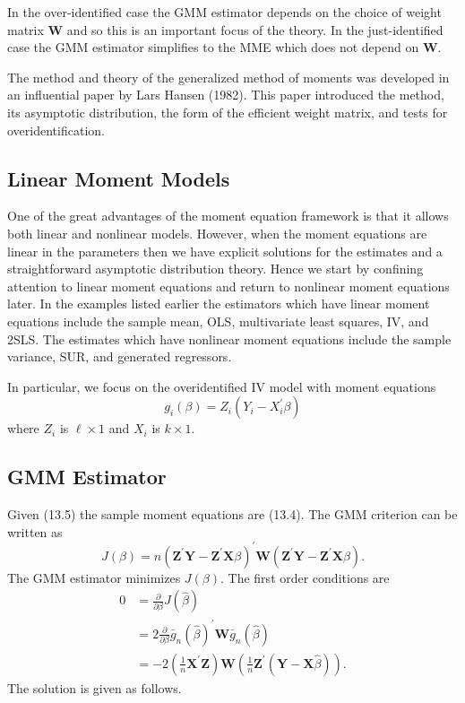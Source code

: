 \documentclass[10pt]{article}
\begin{document}
In the over-identified case the GMM estimator depends on the choice of weight matrix $\boldsymbol{W}$ and so this is an important focus of the theory. In the just-identified case the GMM estimator simplifies to the MME which does not depend on $\boldsymbol{W}$.

The method and theory of the generalized method of moments was developed in an influential paper by Lars Hansen (1982). This paper introduced the method, its asymptotic distribution, the form of the efficient weight matrix, and tests for overidentification.

\subsection{Linear Moment Models}
One of the great advantages of the moment equation framework is that it allows both linear and nonlinear models. However, when the moment equations are linear in the parameters then we have explicit solutions for the estimates and a straightforward asymptotic distribution theory. Hence we start by confining attention to linear moment equations and return to nonlinear moment equations later. In the examples listed earlier the estimators which have linear moment equations include the sample mean, OLS, multivariate least squares, IV, and 2SLS. The estimates which have nonlinear moment equations include the sample variance, SUR, and generated regressors.

In particular, we focus on the overidentified IV model with moment equations
$$
g_{i}(\beta)=Z_{i}\left(Y_{i}-X_{i}^{\prime} \beta\right)
$$
where $Z_{i}$ is $\ell \times 1$ and $X_{i}$ is $k \times 1$.

\subsection{GMM Estimator}
Given (13.5) the sample moment equations are (13.4). The GMM criterion can be written as
$$
J(\beta)=n\left(\boldsymbol{Z}^{\prime} \boldsymbol{Y}-\boldsymbol{Z}^{\prime} \boldsymbol{X} \beta\right)^{\prime} \boldsymbol{W}\left(\boldsymbol{Z}^{\prime} \boldsymbol{Y}-\boldsymbol{Z}^{\prime} \boldsymbol{X} \beta\right) .
$$
The GMM estimator minimizes $J(\beta)$. The first order conditions are
$$
\begin{aligned}
0 &=\frac{\partial}{\partial \beta} J(\widehat{\beta}) \\
&=2 \frac{\partial}{\partial \beta} \bar{g}_{n}(\widehat{\beta})^{\prime} \boldsymbol{W} \bar{g}_{n}(\widehat{\beta}) \\
&=-2\left(\frac{1}{n} \boldsymbol{X}^{\prime} \boldsymbol{Z}\right) \boldsymbol{W}\left(\frac{1}{n} \boldsymbol{Z}^{\prime}(\boldsymbol{Y}-\boldsymbol{X} \widehat{\beta})\right) .
\end{aligned}
$$
The solution is given as follows.
\end{document}
